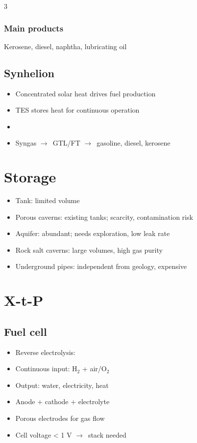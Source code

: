 \documentclass[9pt, landscape, a4paper]{article}
\let\mathto\to
\renewcommand{\to}{\ensuremath{\mathto}\ }
\begin{document}
\begin{multicols*}{3}
\subsubsection{Main products}
Kerosene, diesel, naphtha, lubricating oil

\subsection{Synhelion}
\begin{itemize}
  \item Concentrated solar heat drives fuel production
  \item TES stores heat for continuous operation
  \item {}
  \item Syngas \to GTL/FT \to gasoline, diesel, kerosene
\end{itemize}

\section{Storage}
\begin{itemize}
  \item Tank: limited volume
  \item Porous caverns: existing tanks; scarcity, contamination risk
  \item Aquifer: abundant; needs exploration, low leak rate
  \item Rock salt caverns: large volumes, high gas purity
  \item Underground pipes: independent from geology, expensive
\end{itemize}

\section{X-t-P}
\subsection{Fuel cell}
\begin{itemize}
  \item Reverse electrolysis: 
  \item Continuous input: H$_2$ + air/O$_2$
  \item Output: water, electricity, heat
  \item Anode + cathode + electrolyte
  \item Porous electrodes for gas flow
  \item Cell voltage < 1 V \to stack needed
\end{itemize}


\end{multicols*}
\end{document}
